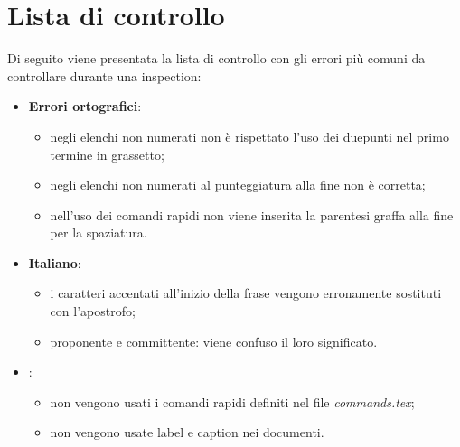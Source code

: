 %


\appendix
\section{Lista di controllo} %
\label{sec:lista_di_controllo}
Di seguito viene presentata la lista di controllo con gli errori più comuni da controllare durante una inspection:
	\begin{itemize}
		\item \textbf{Errori ortografici}:
			\begin{itemize}
				\item negli elenchi non numerati non è rispettato l'uso dei duepunti nel primo termine in grassetto;
				\item negli elenchi non numerati al punteggiatura alla fine non è corretta;
				\item nell'uso dei comandi rapidi non viene inserita la parentesi graffa alla fine per la spaziatura.
			\end{itemize}

		\item \textbf{Italiano}:
			\begin{itemize}
				\item i caratteri accentati all'inizio della frase vengono erronamente sostituti con l'apostrofo;
				\item proponente e committente: viene confuso il loro significato.
			\end{itemize}

		\item \textbf{\LateX}:
			\begin{itemize}
				\item non vengono usati i comandi rapidi definiti nel file \emph{commands.tex};
				\item non vengono usate label e caption nei documenti.
			\end{itemize}
	\end{itemize}
